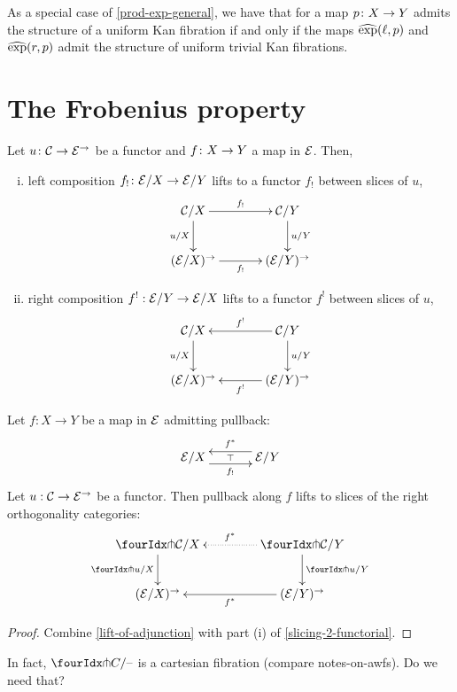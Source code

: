 \documentclass[reqno,10pt,a4paper,oneside]{amsart}
\begin{document}
 As a special case of \cref{prod-exp-general}, we have
that for a map $p \colon X \to Y$ admits the structure of a uniform Kan fibration 
if and only if 
 the maps $\operatorname{\widehat{exp}}(\ell, p)$ and $\operatorname{\widehat{exp}}(r, p)$ admit the structure of
uniform trivial Kan fibrations. 




\section{The Frobenius property}

\begin{lemma}
\label{slicing-2-functorial}
Let $u \colon \mathcal{C} \to \mathcal{E}^{\to}$ be a functor and $f \colon X \to Y$ a map in $\mathcal{E}$. Then, 
\begin{enumerate}[(i)]
\item left composition $f_! \colon \mathcal{E}/X \to \mathcal{E}/Y$ lifts to a functor $f_!$ between slices of $u$,
\[
\xymatrix@C+1em{
  \cal{C}/X
  \ar[r]^-{f_!}
  \ar[d]_{u/X}
&
  \cal{C}/Y
  \ar[d]^{u/Y}
\\
  (\calE/X)^{\to}
  \ar[r]_-{f_!}
&
  (\calE/Y)^{\to}
}
\]
\item right composition $f^! : \mathcal{E}/Y \to \mathcal{E}/X$ lifts to a functor $f^!$ between slices of $u$,
\[
\xymatrix@C+1em{
  \cal{C}/X
  \ar[d]_{u/X}
&
  \cal{C}/Y
  \ar[l]_-{f^!}
  \ar[d]^{u/Y}
\\
  (\calE/X)^{\to}
&
  (\calE/Y)^{\to}
  \ar[l]^-{f^!}
}
\]
\end{enumerate}
\end{lemma}

\begin{proposition}
\label{lift-pullback}
Let $f : X \to Y$ be a map in $\mathcal{E}$ admitting pullback:
\[
\xymatrix@C+1em{
  \catE/X
  \ar@<-5pt>[r]_{f_!}
  \ar@{}[r]|{\top}
&
  \catE/Y
  \ar@<-5pt>[l]_{f^*}
}
\]
Let $u : \mathcal{C} \to \mathcal{E}^{\to}$ be a functor.
Then pullback along $f$ lifts to slices of the right orthogonality categories:
\[
\xymatrix@C=1.5cm{
  \liftr{\cal{C}}/X
  \ar[d]_{\liftr{u}/X}
&
  \liftr{\cal{C}}/Y
  \ar@{.>}[l]_{f^*}
  \ar[d]^{\liftr{u}/Y}
\\
  (\catE/X)^{\to}
&
  (\catE/Y)^{\to}
  \ar[l]^{f^*}
}
\]
\end{proposition}

\begin{proof}
Combine \cref{lift-of-adjunction} with part (i) of \cref{slicing-2-functorial}.
\end{proof}

\begin{question}
In fact, $\liftr{C}/\text{--}$ is a cartesian fibration (compare notes-on-awfs).
Do we need that?
\end{question}
\end{document}
